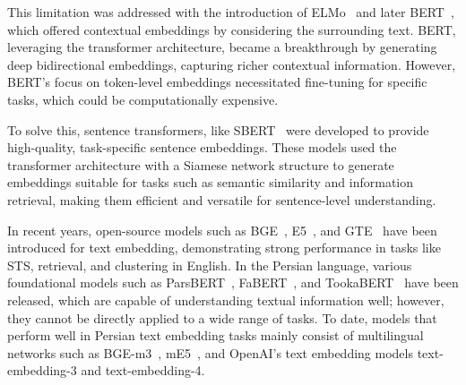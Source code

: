 This limitation was addressed with the introduction of ELMo~\citep{peters-etal-2018-deep} and later BERT~\citep{Devlin2019BERTPO}, which offered contextual embeddings by considering the surrounding text. BERT, leveraging the transformer architecture, became a breakthrough by generating deep bidirectional embeddings, capturing richer contextual information. However, BERT's focus on token-level embeddings necessitated fine-tuning for specific tasks, which could be computationally expensive.

To solve this, sentence transformers, like SBERT~\citep{Reimers2019SentenceBERTSE} were developed to provide high-quality, task-specific sentence embeddings. These models used the transformer architecture with a Siamese network structure to generate embeddings suitable for tasks such as semantic similarity and information retrieval, making them efficient and versatile for sentence-level understanding.

In recent years, open-source models such as BGE~\citep{10.1145/3626772.3657878}, E5~\citep{Wang2022TextEB}, and GTE~\citep{li2023generaltextembeddingsmultistage} have been introduced for text embedding, demonstrating strong performance in tasks like STS, retrieval, and clustering in English. In the Persian language, various foundational models such as ParsBERT~\citep{Farahani2020ParsBERTTM}, FaBERT~\citep{Masumi2024FaBERTPB}, and TookaBERT~\citep{sadraeijavaheri2024tookabertstepforwardpersian} have been released, which are capable of understanding textual information well; however, they cannot be directly applied to a wide range of tasks. To date, models that perform well in Persian text embedding tasks mainly consist of multilingual networks such as BGE-m3~\citep{chen-etal-2024-m3}, mE5~\citep{wang2024multilinguale5textembeddings}, and OpenAI's text embedding models text-embedding-3 and text-embedding-4.